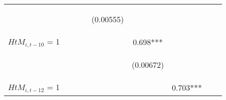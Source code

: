 \begin{center}
\begin{tabular}{lcccccccc}
\vspace{4pt} & \begin{footnotesize}\end{footnotesize} & \begin{footnotesize}\end{footnotesize} & \begin{footnotesize}\end{footnotesize} & \begin{footnotesize}(0.00555)\end{footnotesize} & \begin{footnotesize}\end{footnotesize} & \begin{footnotesize}\end{footnotesize} & \begin{footnotesize}\end{footnotesize} & \begin{footnotesize}\end{footnotesize} \\
$ {HtM}_{i, t-10} $ = 1 &  &  &  &  & 0.698*** &  &  &  \\
\vspace{4pt} & \begin{footnotesize}\end{footnotesize} & \begin{footnotesize}\end{footnotesize} & \begin{footnotesize}\end{footnotesize} & \begin{footnotesize}\end{footnotesize} & \begin{footnotesize}(0.00672)\end{footnotesize} & \begin{footnotesize}\end{footnotesize} & \begin{footnotesize}\end{footnotesize} & \begin{footnotesize}\end{footnotesize} \\
$ {HtM}_{i, t-12} $ = 1 &  &  &  &  &  & 0.703*** &  &  \\

\end{tabular}
\end{center}
